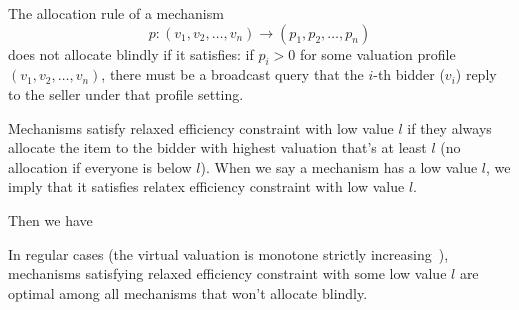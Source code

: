\begin{definition}\label{def:allocation_cost}
The allocation rule of a mechanism $$p: (v_1, v_2, \ldots, v_n) \rightarrow
(p_1, p_2, \ldots, p_n)$$ does not allocate blindly if it satisfies: if $p_i >
0$ for some valuation profile $(v_1, v_2, \ldots, v_n)$, there must be a
broadcast query that the $i$-th bidder ($v_i$) reply to the seller
under that profile setting.
\end{definition}

\begin{definition}

Mechanisms satisfy relaxed efficiency constraint with low value $l$
if they always allocate the item to the bidder with highest valuation that's
at least $l$ (no allocation if everyone is below $l$).
%
%
%
%
%
When we say a mechanism has a low value $l$, we imply that it
satisfies relatex efficiency constraint with low value $l$.

\end{definition}

Then we have

\begin{theorem}
In regular cases (the virtual valuation is monotone strictly increasing~\cite{}),
mechanisms satisfying relaxed efficiency constraint with some low value $l$ are
optimal among all mechanisms that won't allocate blindly.

\end{theorem}


